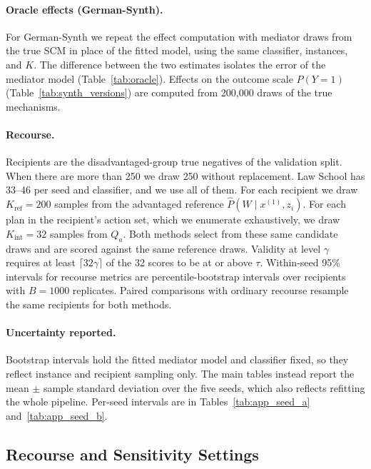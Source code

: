 \paragraph{Oracle effects (German-Synth).}
For German-Synth we repeat the effect computation with mediator draws from the
true SCM in place of the fitted model, using the same classifier, instances,
and $K$. The difference between the two estimates isolates the error of the
mediator model (Table~\ref{tab:oracle}). Effects on the outcome scale
$P(Y=1)$ (Table~\ref{tab:synth_versions}) are computed from 200{,}000 draws of
the true mechanisms.

\paragraph{Recourse.}
Recipients are the disadvantaged-group true negatives of the validation
split. When there are more than 250 we draw 250 without replacement. Law
School has 33--46 per seed and classifier, and we use all of them. For each
recipient we draw $K_{\mathrm{ref}}=200$ samples from the advantaged reference
$\hat P(W\mid x^{(1)},z_i)$. For each plan in the recipient's action set,
which we enumerate exhaustively, we draw $K_{\mathrm{int}}=32$ samples from
$Q_a$. Both methods select from these same candidate draws and are scored
against the same reference draws. Validity at level $\gamma$ requires at least
$\lceil 32\gamma\rceil$ of the 32 scores to be at or above $\tau$. Within-seed
95\% intervals for recourse metrics are percentile-bootstrap intervals over
recipients with $B=1000$ replicates. Paired comparisons with ordinary recourse
resample the same recipients for both methods.

\paragraph{Uncertainty reported.}
Bootstrap intervals hold the fitted mediator model and classifier fixed, so
they reflect instance and recipient sampling only. The main tables instead
report the mean $\pm$ sample standard deviation over the five seeds, which
also reflects refitting the whole pipeline. Per-seed intervals are in
Tables~\ref{tab:app_seed_a} and~\ref{tab:app_seed_b}.

\subsection{Recourse and Sensitivity Settings}
\label{app:exp_recourse}

